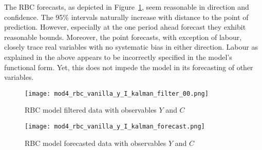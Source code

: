 \documentclass[12pt,a4paper,english]{article} %
\begin{document}
	The RBC forecasts, as depicted in Figure~\ref{fig:rbc_kfor}, seem reasonable in direction and confidence. The 95\% intervals naturally increase with distance to the point of prediction. However, especially at the one period ahead forecast they exhibit reasonable bounds. Moreover, the point forecasts, with exception of labour, closely trace real variables with no systematic bias in either direction. Labour as explained in the above appears to be incorrectly specified in the model's functional form. Yet, this does not impede the model in its forecasting of other variables. 
	\begin{figure}[H]
		\begin{center}
			\texttt{[image: mod4\_rbc\_vanilla\_y\_I\_kalman\_filter\_00.png]}
			\caption{RBC model filtered data with observables $Y$ and $C$}\label{fig:rbc_kfil}
			
			\texttt{[image: mod4\_rbc\_vanilla\_y\_I\_kalman\_forecast.png]}
			\caption{RBC model forecasted data with observables $Y$ and $C$}\label{fig:rbc_kfor}
		\end{center}
	\end{figure}
	
\end{document}
